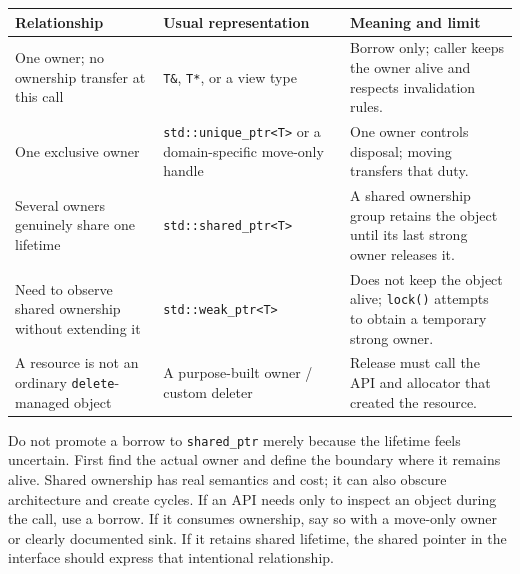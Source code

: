 {\def\LTcaptype{none} %
\begin{longtable}[]{@{}
  >{\raggedright\arraybackslash}p{}
  >{\raggedright\arraybackslash}p{}
  >{\raggedright\arraybackslash}p{}@{}}
\toprule\noalign{}
\begin{minipage}[b]{\linewidth}\raggedright
Relationship
\end{minipage} & \begin{minipage}[b]{\linewidth}\raggedright
Usual representation
\end{minipage} & \begin{minipage}[b]{\linewidth}\raggedright
Meaning and limit
\end{minipage} \\
\midrule\noalign{}
\endhead
\bottomrule\noalign{}
\endlastfoot
One owner; no ownership transfer at this call & \texttt{T\&}, \texttt{T*}, or a view type & Borrow only; caller keeps the owner alive and respects invalidation rules. \\
One exclusive owner & \texttt{std::unique\_ptr\textless{}T\textgreater{}} or a domain-specific move-only handle & One owner controls disposal; moving transfers that duty. \\
Several owners genuinely share one lifetime & \texttt{std::shared\_ptr\textless{}T\textgreater{}} & A shared ownership group retains the object until its last strong owner releases it. \\
Need to observe shared ownership without extending it & \texttt{std::weak\_ptr\textless{}T\textgreater{}} & Does not keep the object alive; \texttt{lock()} attempts to obtain a temporary strong owner. \\
A resource is not an ordinary \texttt{delete}-managed object & A purpose-built owner / custom deleter & Release must call the API and allocator that created the resource. \\
\end{longtable}
}

Do not promote a borrow to \texttt{shared\_ptr} merely because the lifetime feels uncertain. First find the actual owner and define the boundary where it remains alive. Shared ownership has real semantics and cost; it can also obscure architecture and create cycles. If an API needs only to inspect an object during the call, use a borrow. If it consumes ownership, say so with a move-only owner or clearly documented sink. If it retains shared lifetime, the shared pointer in the interface should express that intentional relationship.

